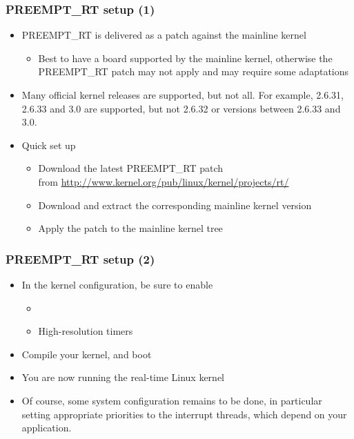 \begin{frame}
  \frametitle{PREEMPT\_RT setup (1)}
  \begin{itemize}
  \item PREEMPT\_RT is delivered as a patch against the mainline
    kernel
    \begin{itemize}
    \item Best to have a board supported by the mainline kernel,
      otherwise the PREEMPT\_RT patch may not apply and may require
      some adaptations
    \end{itemize}
  \item Many official kernel releases are supported, but not all. For
    example, 2.6.31, 2.6.33 and 3.0 are supported, but not 2.6.32 or
    versions between 2.6.33 and 3.0.
  \item Quick set up
    \begin{itemize}
    \item Download the latest PREEMPT\_RT patch\\
      from \footnotesize \url{http://www.kernel.org/pub/linux/kernel/projects/rt/} \normalsize
    \item Download and extract the corresponding mainline kernel
      version
    \item Apply the patch to the mainline kernel tree
    \end{itemize}
  \end{itemize}
\end{frame}

\begin{frame}
  \frametitle{PREEMPT\_RT setup (2)}
  \begin{itemize}
  \item In the kernel configuration, be sure to enable
    \begin{itemize}
    \item {}
    \item High-resolution timers
    \end{itemize}
  \item Compile your kernel, and boot
  \item You are now running the real-time Linux kernel
  \item Of course, some system configuration remains to be done, in
    particular setting appropriate priorities to the interrupt
    threads, which depend on your application.
  \end{itemize}
\end{frame}

